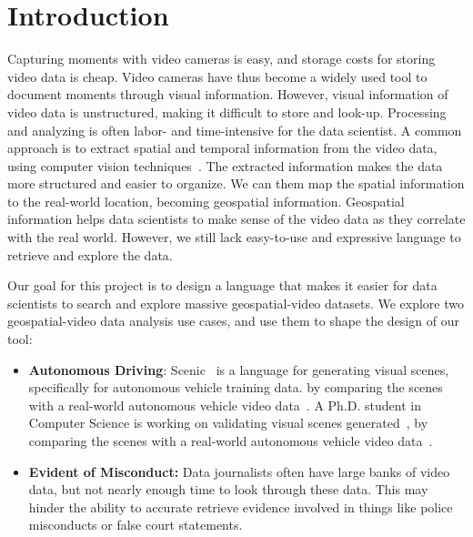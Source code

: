 
\section{Introduction}

Capturing moments with video cameras is easy, and storage costs for storing video data is cheap. Video cameras have thus become a widely used tool to document moments through visual information.
However, visual information of video data is unstructured, making it difficult to store and look-up.
Processing and analyzing is often labor- and time-intensive for the data scientist. 
A common approach is to extract spatial and temporal information from the video data, using computer vision techniques~\cite{redmon:yolo,wojke:deepsort}.
The extracted information makes the data more structured and easier to organize.
We can them map the spatial information to the real-world location, becoming geospatial information.
Geospatial information helps data scientists to make sense of the video data as they correlate with the real world.
However, we still lack easy-to-use and expressive language to retrieve and explore the data.

Our goal for this project is to design a language that makes it easier for data scientists to search and explore massive geospatial-video datasets. We explore two geospatial-video data analysis use cases, and use them to shape the design of our tool:

\begin{itemize}
    \item
    \textbf{Autonomous Driving}: Scenic~\cite{fremont:scenic} is a language for generating visual scenes, specifically for autonomous vehicle training data.
    by comparing the scenes with a real-world autonomous vehicle video data~\cite{ceasar:nuscenes}.
    A Ph.D. student in Computer Science is working on validating visual scenes generated~\cite{kim:scenic-validation},
    by comparing the scenes with a real-world autonomous vehicle video data~\cite{ceasar:nuscenes}.
    
    \item
    \textbf{Evident of Misconduct:}
    Data journalists often have large banks of video data, but not nearly enough time to look through these data. This may hinder the ability to accurate retrieve evidence involved in things like police misconducts or false court statements.
\end{itemize}

